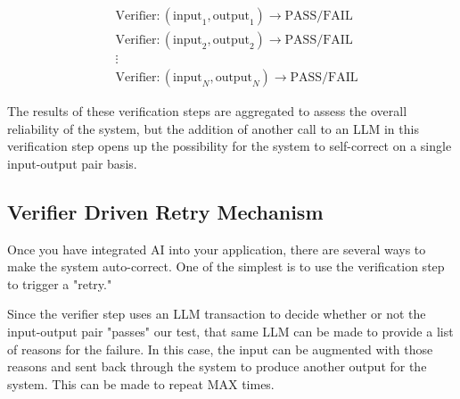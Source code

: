 \documentclass{article}
\begin{document}
\begin{equation*}
\begin{aligned}
&\text{Verifier}: (\text{input}_1,  \text{output}_1) \rightarrow \text{PASS/FAIL} \\
&\text{Verifier}: (\text{input}_2,  \text{output}_2) \rightarrow \text{PASS/FAIL} \\
&\vdots \\
&\text{Verifier}: (\text{input}_N,  \text{output}_N) \rightarrow \text{PASS/FAIL}
\end{aligned}
\end{equation*}

The results of these verification steps are aggregated to assess the overall reliability of the system, but the addition of another call to an LLM in this verification step opens up the possibility for the system to self-correct on a single input-output pair basis.

\pagebreak
\subsection{Verifier Driven Retry Mechanism}

Once you have integrated AI into your application, there are several ways to make the system auto-correct. One of the simplest is to use the verification step to trigger a "retry."

Since the verifier step uses an LLM transaction to decide whether or not the input-output pair "passes" our test, that same LLM can be made to provide a list of reasons for the failure. In this case, the input can be augmented with those reasons and sent back through the system to produce another output for the system. This can be made to repeat \( \text{MAX} \) times.
\end{document}
